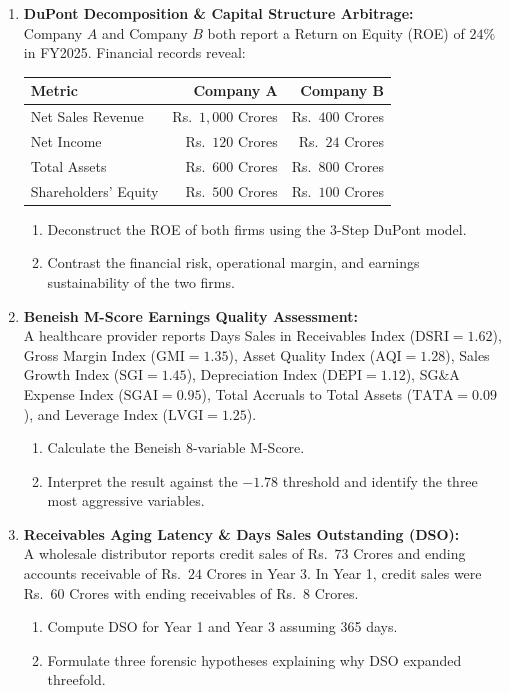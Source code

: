 \begin{enumerate}[label=\textbf{P5.\arabic*}]
    \item \textbf{DuPont Decomposition \& Capital Structure Arbitrage:}\\
    Company $A$ and Company $B$ both report a Return on Equity (ROE) of $24\%$ in FY2025. Financial records reveal:
    \begin{center}
    \begin{tabular}{lrr}
    \toprule
    \textbf{Metric} & \textbf{Company A} & \textbf{Company B} \\
    \midrule
    Net Sales Revenue & Rs.~$1{,}000$ Crores & Rs.~$400$ Crores \\
    Net Income & Rs.~$120$ Crores & Rs.~$24$ Crores \\
    Total Assets & Rs.~$600$ Crores & Rs.~$800$ Crores \\
    Shareholders' Equity & Rs.~$500$ Crores & Rs.~$100$ Crores \\
    \bottomrule
    \end{tabular}
    \end{center}
    \begin{enumerate}[label=(\alph*)]
        \item Deconstruct the ROE of both firms using the 3-Step DuPont model.
        \item Contrast the financial risk, operational margin, and earnings sustainability of the two firms.
    \end{enumerate}

    \item \textbf{Beneish M-Score Earnings Quality Assessment:}\\
    A healthcare provider reports Days Sales in Receivables Index ($\text{DSRI} = 1.62$), Gross Margin Index ($\text{GMI} = 1.35$), Asset Quality Index ($\text{AQI} = 1.28$), Sales Growth Index ($\text{SGI} = 1.45$), Depreciation Index ($\text{DEPI} = 1.12$), SG\&A Expense Index ($\text{SGAI} = 0.95$), Total Accruals to Total Assets ($\text{TATA} = 0.09$), and Leverage Index ($\text{LVGI} = 1.25$).
    \begin{enumerate}[label=(\alph*)]
        \item Calculate the Beneish 8-variable M-Score.
        \item Interpret the result against the $-1.78$ threshold and identify the three most aggressive variables.
    \end{enumerate}

    \item \textbf{Receivables Aging Latency \& Days Sales Outstanding (DSO):}\\
    A wholesale distributor reports credit sales of Rs.~$73$ Crores and ending accounts receivable of Rs.~$24$ Crores in Year 3. In Year 1, credit sales were Rs.~$60$ Crores with ending receivables of Rs.~$8$ Crores.
    \begin{enumerate}[label=(\alph*)]
        \item Compute DSO for Year 1 and Year 3 assuming 365 days.
        \item Formulate three forensic hypotheses explaining why DSO expanded threefold.
    \end{enumerate}
\end{enumerate}

